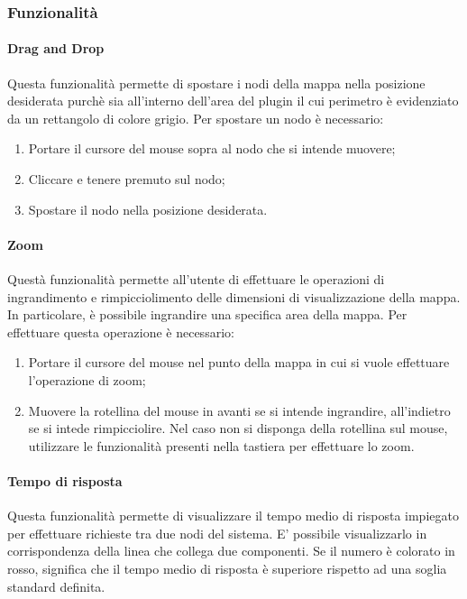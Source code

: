 \subsubsection{Funzionalità}
    \paragraph {Drag and Drop} \Spazio
Questa funzionalità permette di spostare i nodi della mappa nella posizione desiderata purchè sia all'interno dell'area del plugin il cui perimetro è evidenziato da un rettangolo di colore grigio.
Per spostare un nodo è necessario: 
\begin{enumerate}
	
	\item Portare il cursore del mouse sopra al nodo che si intende muovere;
	\item Cliccare e tenere premuto sul nodo;
	\item Spostare il nodo nella posizione desiderata.
	
\end{enumerate}

\paragraph{Zoom} \Spazio
Questà funzionalità permette all'utente di effettuare le operazioni di ingrandimento e rimpicciolimento delle dimensioni di visualizzazione della mappa. In particolare, è possibile ingrandire una specifica area della mappa.
Per effettuare questa operazione è necessario:

\begin{enumerate}
	
	\item Portare il cursore del mouse nel punto della mappa in cui si vuole effettuare l'operazione di zoom;
	\item Muovere la rotellina del mouse in avanti se si intende ingrandire, all'indietro se si intede rimpicciolire. Nel caso non si disponga della rotellina sul mouse, utilizzare le funzionalità presenti nella tastiera per effettuare lo zoom.
	
\end{enumerate}

\paragraph{Tempo di risposta} \Spazio
Questa funzionalità permette di visualizzare il tempo medio di risposta impiegato per effettuare richieste tra due nodi del sistema.
E' possibile visualizzarlo in corrispondenza della linea che collega due componenti.
Se il numero è colorato in rosso, significa che il tempo medio di risposta è superiore rispetto ad una soglia standard definita.




